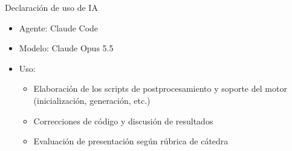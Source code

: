 \begin{frame}{Declaración de uso de IA}
  \begin{itemize}\setlength{\itemsep}{10pt}
    \item Agente: Claude Code
    \item Modelo: Claude Opus 5.5
    \item Uso:
      \begin{itemize}
        \item Elaboración de los scripts de postprocesamiento y soporte del motor (inicialización, generación, etc.)
        \item Correcciones de código y discusión de resultados
        \item Evaluación de presentación según rúbrica de cátedra
      \end{itemize}
  \end{itemize}
\end{frame}
